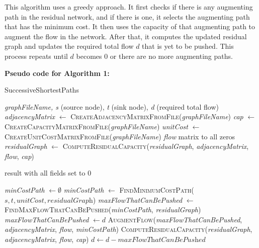 \documentclass{article}
\begin{document}
This algorithm uses a greedy approach. It first checks if there is any augmenting path in the residual network, and if there is one, it selects the augmenting path that has the minimum cost. It then uses the capacity of that augmenting path to augment the flow in the network. After that, it computes the updated residual graph and updates the required total flow \(d\) that is yet to be pushed. This process repeats until \(d\) becomes 0 or there are no more augmenting paths.

\textbf{Pseudo code for Algorithm 1:}


\begin{algorithm}[H]
\caption{\textcolor{keywordcolor}{SuccessiveShortestPaths}}
\begin{algorithmic}[1]
\State {} \textit{graphFileName, s} (source node), \textit{t} (sink node), \textit{d} (required total flow)
\State \textit{adjacencyMatrix} $\gets$ \textcolor{identifiercolor}{\textsc{CreateAdjacencyMatrixFromFile}}(\textit{graphFileName})
\State \textit{cap} $\gets$ \textcolor{identifiercolor}{\textsc{CreateCapacityMatrixFromFile}}(\textit{graphFileName})
\State \textit{unitCost} $\gets$ \textcolor{identifiercolor}{\textsc{CreateUnitCostMatrixFromFile}}(\textit{graphFileName})
\State {} \textit{flow} matrix to all zeros
\State \textit{residualGraph} $\gets$ \textcolor{identifiercolor}{\textsc{ComputeResidualCapacity}}(\textit{residualGraph}, \textit{adjacencyMatrix}, \textit{flow}, \textit{cap})

    \State \Return result with all fields set to 0
\EndIf

    \State {} \textit{minCostPath} $\gets \emptyset$
    \State \textit{minCostPath} $\gets$ \textcolor{identifiercolor}{\textsc{FindMinimumCostPath}}($s, t, \textit{unitCost}, \textit{residualGraph}$)
    \State \textit{maxFlowThatCanBePushed} $\gets$ \textcolor{identifiercolor}{\textsc{FindMaxFlowThatCanBePushed}}(\textit{minCostPath}, \textit{residualGraph})
        \State \textit{maxFlowThatCanBePushed} $\gets d$
    \EndIf
    \State \textcolor{identifiercolor}{\textsc{AugmentFlow}}(\textit{maxFlowThatCanBePushed}, \textit{adjacencyMatrix}, \textit{flow}, \textit{minCostPath})
    \State \textcolor{identifiercolor}{\textsc{ComputeResidualCapacity}}(\textit{residualGraph}, \textit{adjacencyMatrix}, \textit{flow}, \textit{cap})
    \State $d \gets d - \textit{maxFlowThatCanBePushed}$
\EndWhile


\end{algorithmic}
\end{algorithm}
\end{document}
